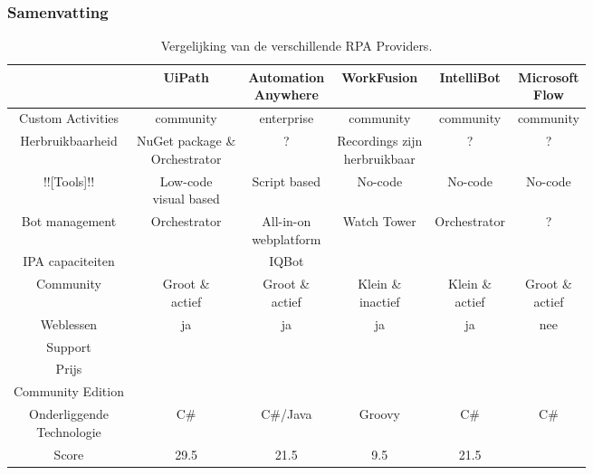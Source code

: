 \subsubsection{Samenvatting}
\begin{table}[h!]
	\centering
	\begin{tabular}{|c||c|c|c|c|c|}
		\hline
		& UiPath & \makecell{Automation\\Anywhere} & WorkFusion & IntelliBot & \makecell{Microsoft\\Flow} \\
		\hline
		\hline
		Custom Activities & community & enterprise & community & community & community \\
		\hline
		Herbruikbaarheid & \makecell{NuGet package \&\\Orchestrator}  & ? & \makecell{Recordings zijn\\herbruikbaar} & ? & ? \\
		\hline
		!![Tools]!! & \makecell{Low-code\\visual based} & Script based & No-code & No-code & No-code \\
		\hline
		Bot management & Orchestrator & \makecell{All-in-on\\webplatform} & Watch Tower & Orchestrator & ? \\
		\hline
		IPA capaciteiten &  & IQBot &  &  & \\
		\hline
		Community & \makecell{Groot \&\\actief} & \makecell{Groot \&\\actief} & \makecell{Klein \&\\inactief} & \makecell{Klein \&\\actief} & \makecell{Groot \&\\actief} \\
		\hline
		Weblessen & ja & ja & ja & ja & nee \\
		\hline
		Support &  &  &  &  & \\
		\hline
		Prijs &  &  &  &  & \\
		\hline
		Community Edition &  &  &  &  & \\
		\hline
		\makecell{Onderliggende\\Technologie} & C\# & C\#/Java & Groovy & C\# & C\# \\
		\hline
		\hline
		Score & 29.5 & 21.5 & 9.5 & 21.5 &  \\
		\hline
	\end{tabular}
	\caption{Vergelijking van de verschillende RPA Providers.}
	\label{Vergelijking}
\end{table}
